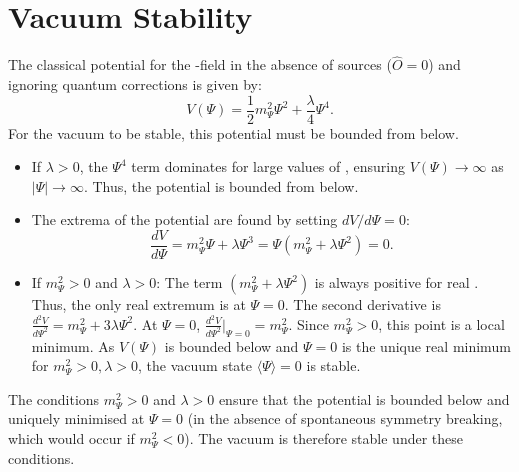 \documentclass[11pt,a4paper]{article}
\newcommand{\PsiField}{\ensuremath{\Psi}}
\newcommand{\expval}[1]{\ensuremath{\langle#1\rangle}}
\begin{document}
\section{Vacuum Stability}
\label{sec:vacuum-stability}
The classical potential for the \PsiFieldField-field in the absence of sources ($\hat{O}=0$) and ignoring quantum corrections is given by:
\begin{equation}
    V(\PsiField) = \frac{1}{2}m_\PsiField^{2}\PsiField^{2} + \frac{\lambda}{4}\PsiField^{4}.
\end{equation}
For the vacuum to be stable, this potential must be bounded from below.
\begin{itemize}
    \item If $\lambda > 0$, the $\PsiField^4$ term dominates for large values of \PsiFieldField, ensuring $V(\PsiField) \to \infty$ as $|\PsiField| \to \infty$. Thus, the potential is bounded from below.
    \item The extrema of the potential are found by setting $dV/d\PsiField = 0$:
    \begin{equation}
        \frac{dV}{d\PsiField} = m_\PsiField^{2}\PsiField + \lambda\PsiField^{3} = \PsiField(m_\PsiField^{2} + \lambda\PsiField^{2}) = 0.
    \end{equation}
    \item If $m_\PsiField^{2} > 0$ and $\lambda > 0$:
    The term $(m_\PsiField^{2} + \lambda\PsiField^{2})$ is always positive for real \PsiFieldField. Thus, the only real extremum is at $\PsiField = 0$.
    The second derivative is $\frac{d^2V}{d\PsiField^2} = m_\PsiField^{2} + 3\lambda\PsiField^{2}$.
    At $\PsiField = 0$, $\frac{d^2V}{d\PsiField^2}|_{\PsiField=0} = m_\PsiField^{2}$. Since $m_\PsiField^{2} > 0$, this point is a local minimum.
    As $V(\PsiField)$ is bounded below and $\PsiField=0$ is the unique real minimum for $m_\PsiField^2 > 0, \lambda > 0$, the vacuum state $\expval{\PsiField}=0$ is stable.
\end{itemize}
The conditions $m_\PsiField^{2}>0$ and $\lambda>0$ ensure that the potential is bounded below and uniquely minimised at $\PsiField=0$ (in the absence of spontaneous symmetry breaking, which would occur if $m_\PsiField^2 < 0$). The vacuum is therefore stable under these conditions.
\end{document}
